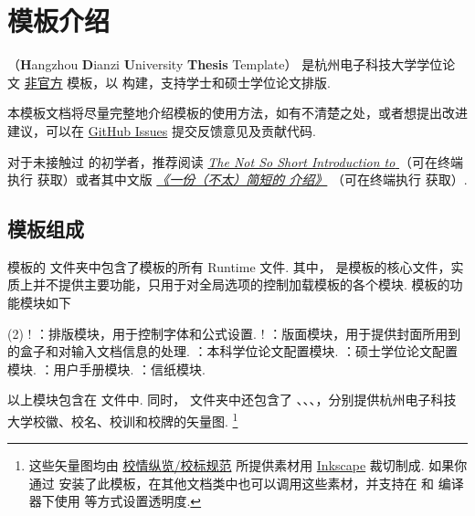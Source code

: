\section{ 模板介绍}

（\textbf Hangzhou \textbf Dianzi \textbf University  \textbf{Thesis} Template） 是杭州电子科技大学学位论文 \underline{非官方}  模板，以  构建，支持学士和硕士学位论文排版.

本模板文档将尽量完整地介绍模板的使用方法，如有不清楚之处，或者想提出改进建议，可以在 \href{https://github.com/myhsia/hduthesis/issues}{GitHub Issues} 提交反馈意见及贡献代码.

对于未接触过  的初学者，推荐阅读
\href{https://tug.ctan.org/info/lshort/english/lshort.pdf}
  {\emph{The Not So Short Introduction to }}
（可在终端执行  获取）或者其中文版
\href{http://mirrors.ctan.org/info/lshort/chinese/lshort-zh-cn.pdf}
  {\emph{《一份（不太）简短的  介绍》}}
（可在终端执行  获取）.

\subsection{模板组成}

 模板的  文件夹中包含了模板的所有 Runtime 文件.
其中， 是模板的核心文件，实质上并不提供主要功能，只用于对全局选项的控制加载模板的各个模块. 模板的功能模块如下

\begin{tasks}(2)
  \task! ：排版模块，用于控制字体和公式设置.
  \task! ：版面模块，用于提供封面所用到的盒子和对输入文档信息的处理.
  \task {}：本科学位论文配置模块.
  \task {}：硕士学位论文配置模块.
  \task {}：用户手册模块.
  \task {}：信纸模块.
\end{tasks}

以上模块包含在  文件中.
同时， 文件夹中还包含了 、、、，分别提供杭州电子科技大学校徽、校名、校训和校牌的矢量图.
\footnote
  {
    这些矢量图均由 \href{https://www.hdu.edu.cn/666/list.htm}{校情纵览/校标规范} 所提供素材用 \href{https://inkscape.org}{Inkscape} 裁切制成. 如果你通过  安装了此模板，在其他文档类中也可以调用这些素材，并支持在  和  编译器下使用  等方式设置透明度.
  }

